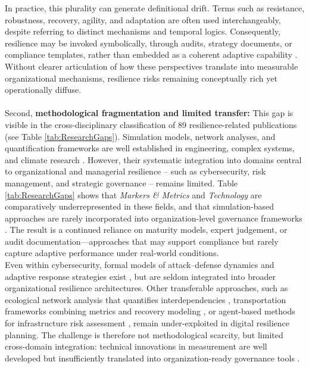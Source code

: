In practice, this plurality can generate definitional drift. Terms such as resistance, robustness, recovery, agility, and adaptation are often used interchangeably, despite referring to distinct mechanisms and temporal logics. Consequently, resilience may be invoked symbolically, through audits, strategy documents, or compliance templates, rather than embedded as a coherent adaptive capability \autocite{duchek2020organizational}. Without clearer articulation of how these perspectives translate into measurable organizational mechanisms, resilience risks remaining conceptually rich yet operationally diffuse.\\
\\
Second, {\bf methodological fragmentation and limited transfer:} This gap is visible in the cross-disciplinary classification of 89 resilience-related publications (see Table \ref{tab:ResearchGaps}). Simulation models, network analyses, and quantification frameworks are well established in engineering, complex systems, and climate research \autocite{francis2014metric}. However, their systematic integration into domains central to organizational and managerial resilience -- such as cybersecurity, risk management, and strategic governance -- remains limited. Table \ref{tab:ResearchGaps} shows that \textit{Markers \& Metrics} and \textit{Technology} are comparatively underrepresented in these fields, and that simulation-based approaches are rarely incorporated into organization-level governance frameworks \autocite{linkov2013resilience, kuypers2018designing}. The result is a continued reliance on maturity models, expert judgement, or audit documentation—approaches that may support compliance but rarely capture adaptive performance under real-world conditions.\\

Even within cybersecurity, formal models of attack–defense dynamics and adaptive response strategies exist \autocite{aydin2018integration}, but are seldom integrated into broader organizational resilience architectures. Other transferable approaches, such as ecological network analysis that quantifies interdependencies \autocite{luke2012systems}, transportation frameworks combining metrics and recovery modeling \autocite{jacobs2017applying}, or agent-based methods for infrastructure risk assessment \autocite{dawson2011agentbased}, remain under-exploited in digital resilience planning. The challenge is therefore not methodological scarcity, but limited cross-domain integration: technical innovations in measurement are well developed but insufficiently translated into organization-ready governance tools \autocite{heinimann2017infrastructure, aerts2018integrating}.\\
\\


